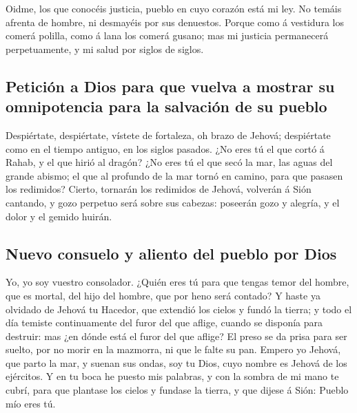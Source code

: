  Oidme, los que conocéis justicia, pueblo en cuyo corazón
está mi ley. No temáis afrenta de hombre, ni desmayéis por sus
denuestos.  Porque como á vestidura los comerá polilla,
como á lana los comerá gusano; mas mi justicia permanecerá
perpetuamente, y mi salud por siglos de siglos.

\hypertarget{peticiuxf3n-a-dios-para-que-vuelva-a-mostrar-su-omnipotencia-para-la-salvaciuxf3n-de-su-pueblo}{%
\subsection{Petición a Dios para que vuelva a mostrar su omnipotencia
para la salvación de su
pueblo}\label{peticiuxf3n-a-dios-para-que-vuelva-a-mostrar-su-omnipotencia-para-la-salvaciuxf3n-de-su-pueblo}}

 Despiértate, despiértate, vístete de fortaleza, oh brazo
de Jehová; despiértate como en el tiempo antiguo, en los siglos pasados.
¿No eres tú el que cortó á Rahab, y el que hirió al dragón?
 ¿No eres tú el que secó la mar, las aguas del grande
abismo; el que al profundo de la mar tornó en camino, para que pasasen
los redimidos?  Cierto, tornarán los redimidos de Jehová,
volverán á Sión cantando, y gozo perpetuo será sobre sus cabezas:
poseerán gozo y alegría, y el dolor y el gemido huirán.

\hypertarget{nuevo-consuelo-y-aliento-del-pueblo-por-dios}{%
\subsection{Nuevo consuelo y aliento del pueblo por
Dios}\label{nuevo-consuelo-y-aliento-del-pueblo-por-dios}}

 Yo, yo soy vuestro consolador. ¿Quién eres tú para que
tengas temor del hombre, que es mortal, del hijo del hombre, que por
heno será contado?  Y haste ya olvidado de Jehová tu
Hacedor, que extendió los cielos y fundó la tierra; y todo el día
temiste continuamente del furor del que aflige, cuando se disponía para
destruir: mas ¿en dónde está el furor del que aflige?  El
preso se da prisa para ser suelto, por no morir en la mazmorra, ni que
le falte su pan.  Empero yo Jehová, que parto la mar, y
suenan sus ondas, soy tu Dios, cuyo nombre es Jehová de los ejércitos.
 Y en tu boca he puesto mis palabras, y con la sombra de
mi mano te cubrí, para que plantase los cielos y fundase la tierra, y
que dijese á Sión: Pueblo mío eres tú.

